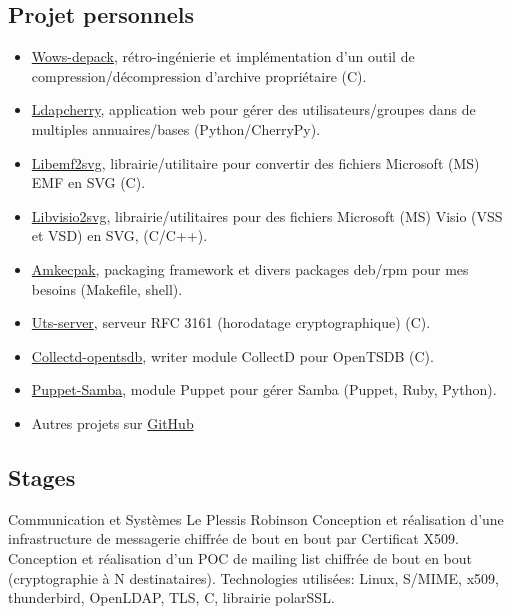 \documentclass[10pt,a4paper,sans]{moderncv}        %
\begin{document}
\subsection{Projet personnels}
        {}
        {}
        {}
        {
            \begin{itemize}
            \item \href{https://github.com/wows-tools/wows-depack}{Wows-depack}, rétro-ingénierie et implémentation d'un outil de compression/décompression d'archive propriétaire (C).
            \item \href{https://github.com/kakwa/ldapcherry}{Ldapcherry}, application web pour gérer des utilisateurs/groupes dans de multiples annuaires/bases (Python/CherryPy).
            \item \href{https://github.com/kakwa/libemf2svg}{Libemf2svg}, librairie/utilitaire pour convertir des fichiers Microsoft (MS) EMF en SVG (C).
            \item \href{https://github.com/kakwa/libvisio2svg}{Libvisio2svg}, librairie/utilitaires pour des fichiers Microsoft (MS) Visio (VSS et VSD) en SVG, (C/C++).
            \item \href{https://github.com/kakwa/amkecpak}{Amkecpak}, packaging framework et divers packages deb/rpm pour mes besoins (Makefile, shell).
            \item \href{https://github.com/kakwa/uts-server}{Uts-server}, serveur RFC 3161 (horodatage cryptographique) (C).
            \item \href{https://github.com/kakwa/collectd-opentsdb}{Collectd-opentsdb}, writer module CollectD pour OpenTSDB (C).
            \item \href{https://github.com/kakwa/puppet-samba}{Puppet-Samba}, module Puppet pour gérer Samba (Puppet, Ruby, Python).
            \item Autres projets sur \href{https://github.com/kakwa?tab=repositories&q=&type=&language=&sort=stargazers}{GitHub}
            \end{itemize}
        }

\subsection{Stages}

        {Communication et Systèmes}
        {Le Plessis Robinson}
        {}
        {Conception et réalisation d'une infrastructure de messagerie chiffrée de bout en bout par
         Certificat X509. Conception et réalisation d'un POC de mailing list chiffrée de bout en bout
         (cryptographie à N destinataires).
         \newline Technologies utilisées: Linux, S/MIME, x509, thunderbird, OpenLDAP, TLS, C, librairie polarSSL.
        }
\end{document}
